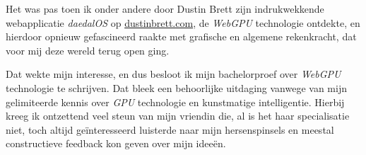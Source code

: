 \bigbreak{}

Het was pas toen ik onder andere door Dustin Brett zijn indrukwekkende webapplicatie \textit{daedalOS} op \href{https://dustinbrett.com/}{dustinbrett.com}, de \textit{WebGPU} technologie ontdekte, en hierdoor opnieuw gefascineerd raakte met grafische en algemene rekenkracht, dat voor mij deze wereld terug open ging.

\bigbreak{}

Dat wekte mijn interesse, en dus besloot ik mijn bachelorproef over \textit{WebGPU} technologie te schrijven. Dat bleek een behoorlijke uitdaging vanwege van mijn gelimiteerde kennis over \textit{GPU} technologie en kunstmatige intelligentie. Hierbij kreeg ik ontzettend veel steun van mijn vriendin die, al is het haar specialisatie niet, toch altijd geïnteresseerd luisterde naar mijn hersenspinsels en meestal constructieve feedback kon geven over mijn ideeën.